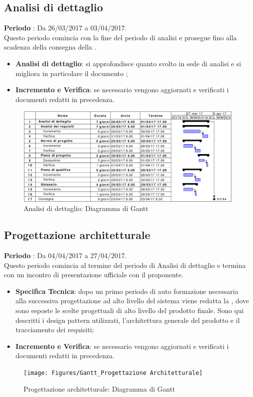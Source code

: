 \documentclass[../PianoDiProgetto.tex]{subfiles}
\begin{document}
			
			
		\subsection{Analisi di dettaglio}
		\textbf{Periodo} : Da 26/03/2017 a 03/04/2017. \\
		Questo periodo comincia con la fine del periodo di analisi e prosegue fino alla scadenza della consegna della \revisionedeirequisiti.
		\begin{itemize}
			\item \textbf{Analisi di dettaglio}: si approfondisce quanto svolto in sede di analisi e si migliora in particolare il documento \analisideirequisiti ;
			\item \textbf{Incremento e Verifica}: se necessario vengono aggiornati e verificati i documenti redatti in precedenza.
		\end{itemize}
		\begin{figure}[H]
			\centering
			\includegraphics[scale=0.55]{Figures/Gantt_AnalisiDettaglio.jpg}
			\caption{Analisi di dettaglio: Diagramma di Gantt}
		\end{figure}
	
	
	
		\subsection{Progettazione architetturale}
		\textbf{Periodo} : Da 04/04/2017 a 27/04/2017. \\
		Questo periodo comincia al termine del periodo di Analisi di dettaglio e termina con un incontro di presentazione ufficiale con il proponente.
		\begin{itemize}
			\item \textbf{Specifica Tecnica}: dopo un primo periodo di auto formazione necessaria alla successiva progettazione ad alto livello del sistema viene redatta la \specificatecnica, dove sono esposte le scelte progettuali di alto livello del prodotto finale. Sono qui descritti i design pattern utilizzati, l'architettura generale del prodotto e il tracciamento dei requisiti;
			\item \textbf{Incremento e Verifica}: se necessario vengono aggiornati e verificati i documenti redatti in precedenza.
		\end{itemize}
		\begin{figure}[H]
			\centering
			\texttt{[image: Figures/Gantt\_Progettazione Architetturale]}
			\caption{Progettazione architetturale: Diagramma di Gantt}
		\end{figure}
		
\end{document}
